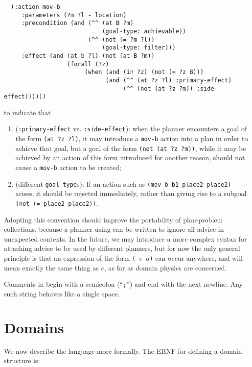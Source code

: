 \begin{verbatim}
  (:action mov-b
     :parameters (?m ?l - location)
     :precondition (and (^^ (at B ?m) 
                            (goal-type: achievable))
                        (^^ (not (= ?m ?l)) 
                            (goal-type: filter)))
     :effect (and (at b ?l) (not (at B ?m))
                  (forall (?z)
                       (when (and (in ?z) (not (= ?z B)))
                             (and (^^ (at ?z ?l) :primary-effect)
                                  (^^ (not (at ?z ?m)) :side-effect))))))
\end{verbatim}

\noindent to indicate that 
\begin{enumerate}
\item ({\tt :primary-effect} vs. {\tt :side-effect}):
when the planner encounters a goal of the form
{\tt (at ?z ?l)}, it may introduce a {\tt mov-b} action into a plan in order to achieve
that goal, but a goal of the form 
{\tt (not (at ?z ?m))}, while it may be achieved by an action of this form
introduced for another reason, should not  cause a {\tt mov-b} action to 
be created; 
\item (different {\tt goal-type}s): If an action such as {\tt (mov-b
b1 place2 place2)} arises, it should be rejected immediately, rather
than giving rise to a subgoal {\tt (not (= place2 place2))}.
\end{enumerate}

Adopting this convention should improve the portability of plan-problem 
collections, because a planner using \lang{} can be written to ignore all
advice in unexpected contexts. 
In the future, we may introduce a more complex syntax for attaching advice
to be used by different planners, but for now the only general principle is
that an expression of the form {\tt (\meta{} $e$ $a$)} can occur anywhere, and
will mean exactly the same thing as $e$, as far as domain physics are concerned.

Comments in \lang{} begin with a semicolon (``{\tt ;}'') and end with
the next newline.  Any such string behaves like a single space.

      \section{Domains}
      \label{domains}
 
We now describe the language more formally. The EBNF
 for defining a domain structure is:

